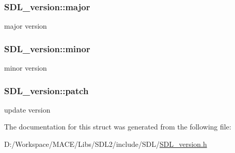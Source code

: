\subsubsection[{\texorpdfstring{major}{major}}]{ S\+D\+L\+\_\+version\+::major}\hypertarget{struct_s_d_l__version_ad7d7674532073eed237b90f546c97cd0}{}\label{struct_s_d_l__version_ad7d7674532073eed237b90f546c97cd0}
major version 
\subsubsection[{\texorpdfstring{minor}{minor}}]{ S\+D\+L\+\_\+version\+::minor}\hypertarget{struct_s_d_l__version_a6c35c7bf80245028d5970e6a504ecf57}{}\label{struct_s_d_l__version_a6c35c7bf80245028d5970e6a504ecf57}
minor version 
\subsubsection[{\texorpdfstring{patch}{patch}}]{ S\+D\+L\+\_\+version\+::patch}\hypertarget{struct_s_d_l__version_aa6dacff18edee8cd037c773b843be0f1}{}\label{struct_s_d_l__version_aa6dacff18edee8cd037c773b843be0f1}
update version 

The documentation for this struct was generated from the following file\+:\begin{DoxyCompactItemize}
\item 
D\+:/\+Workspace/\+M\+A\+C\+E/\+Libs/\+S\+D\+L2/include/\+S\+D\+L/\hyperlink{_s_d_l__version_8h}{S\+D\+L\+\_\+version.\+h}\end{DoxyCompactItemize}
